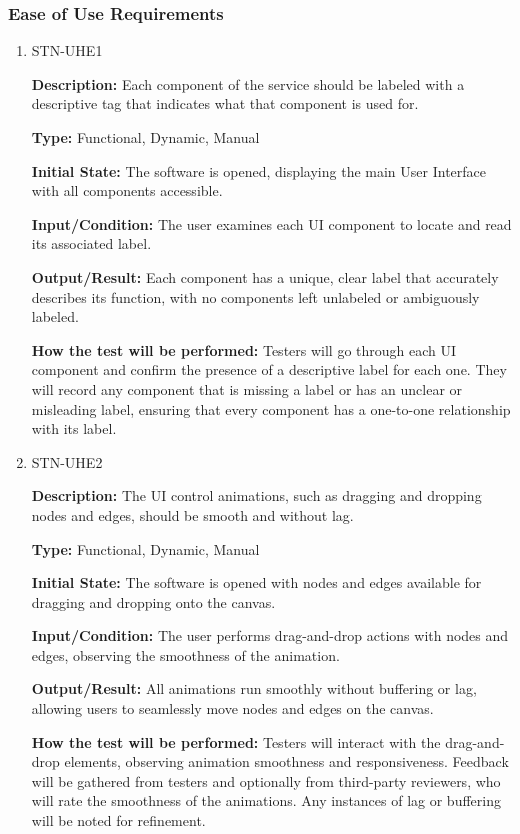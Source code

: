 \documentclass[12pt, titlepage]{article}
\begin{document}
\subsubsection{Ease of Use Requirements}
\begin{enumerate}
\item{STN-UHE1\\}

\textbf{Description:} Each component of the service should be labeled with a descriptive tag that indicates what that component is used for.

\textbf{Type:} Functional, Dynamic, Manual

\textbf{Initial State:} The software is opened, displaying the main User Interface with all components accessible.

\textbf{Input/Condition:} The user examines each UI component to locate and read its associated label.

\textbf{Output/Result:} Each component has a unique, clear label that accurately describes its function, with no components left unlabeled or ambiguously labeled.

\textbf{How the test will be performed:} Testers will go through each UI component and confirm the presence of a descriptive label for each one. They will record any component that is missing a label or has an unclear or misleading label, ensuring that every component has a one-to-one relationship with its label.


\item{STN-UHE2\\}

\textbf{Description:} The UI control animations, such as dragging and dropping nodes and edges, should be smooth and without lag.

\textbf{Type:} Functional, Dynamic, Manual

\textbf{Initial State:} The software is opened with nodes and edges available for dragging and dropping onto the canvas.

\textbf{Input/Condition:} The user performs drag-and-drop actions with nodes and edges, observing the smoothness of the animation.

\textbf{Output/Result:} All animations run smoothly without buffering or lag, allowing users to seamlessly move nodes and edges on the canvas.

\textbf{How the test will be performed:} Testers will interact with the drag-and-drop elements, observing animation smoothness and responsiveness. Feedback will be gathered from testers and optionally from third-party reviewers, who will rate the smoothness of the animations. Any instances of lag or buffering will be noted for refinement.
\end{enumerate}
\end{document}
